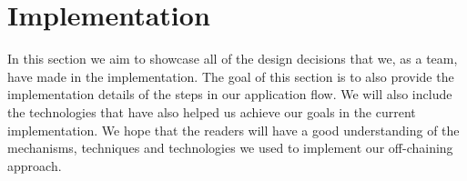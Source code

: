 \section{Implementation}
\label{sec:approach-implementation}

In this section we aim to showcase all of the design decisions that we, as a team, have made in the implementation. The goal of this section is to also provide the implementation details of the steps in our application flow. We will also include the technologies that have also helped us achieve our goals in the current implementation. We hope that the readers will have a good understanding of the mechanisms, techniques and technologies we used to implement our off-chaining approach.

\newpage





